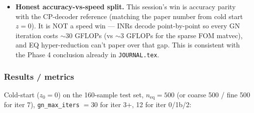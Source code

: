 \begin{itemize}
        decodes to a full-grid field, re-encodes with iter 5's encoder,
        then warm-starts iter 5's solver. Final cold-start median
        rel-L$^2 = 2.88$e-3, 94\% of test parameters below 1e-2, max
        1.42 (a $\sim$6\% high-frequency tail where iter 2's seed is
        poor). Cost: 2 solves $+$ 1 encode per $\mu$ --- speedup over
        FOM is only 1.24$\times$ at fine $n_{\text{eq}}{=}500$,
        0.5$\times$ at fine $n_{\text{eq}}{=}8000$.
  \item \textbf{Honest accuracy-vs-speed split.} This session's win is
        accuracy parity with the CP-decoder reference (matching the
        paper number from cold start $z{=}0$). It is NOT a speed win ---
        INRs decode point-by-point so every GN iteration costs $\sim$30
        GFLOPs (vs $\sim$3 GFLOPs for the sparse FOM matvec), and EQ
        hyper-reduction can't paper over that gap. This is consistent
        with the Phase 4 conclusion already in \texttt{JOURNAL.tex}.
\end{itemize}

\subsubsection*{Results / metrics}

Cold-start ($z_0 = 0$) on the 160-sample test set, $n_{\text{eq}}{=}500$
(or coarse 500 / fine 500 for iter 7), \texttt{gn\_max\_iters} $=30$ for
iter 3+, 12 for iter 0/1b/2:

